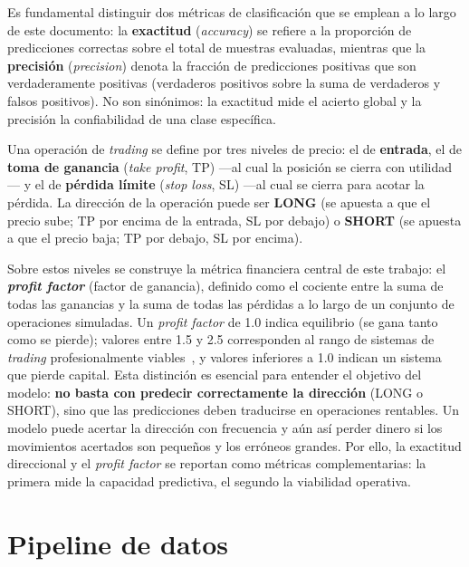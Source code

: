 \documentclass[10pt,twocolumn]{article}
\begin{document}
Es fundamental distinguir dos m\'etricas de clasificaci\'on que se emplean a lo largo de este documento: la \textbf{exactitud} (\textit{accuracy}) se refiere a la proporci\'on de predicciones correctas sobre el total de muestras evaluadas, mientras que la \textbf{precisi\'on} (\textit{precision}) denota la fracci\'on de predicciones positivas que son verdaderamente positivas (verdaderos positivos sobre la suma de verdaderos y falsos positivos). No son sin\'onimos: la exactitud mide el acierto global y la precisi\'on la confiabilidad de una clase espec\'ifica.

Una operaci\'on de \textit{trading} se define por tres niveles de precio: el de \textbf{entrada}, el de \textbf{toma de ganancia} (\textit{take profit}, TP) ---al cual la posici\'on se cierra con utilidad--- y el de \textbf{p\'erdida l\'imite} (\textit{stop loss}, SL) ---al cual se cierra para acotar la p\'erdida. La direcci\'on de la operaci\'on puede ser \textbf{LONG} (se apuesta a que el precio sube; TP por encima de la entrada, SL por debajo) o \textbf{SHORT} (se apuesta a que el precio baja; TP por debajo, SL por encima).

Sobre estos niveles se construye la m\'etrica financiera central de este trabajo: el \textbf{\textit{profit factor}} (factor de ganancia), definido como el cociente entre la suma de todas las ganancias y la suma de todas las p\'erdidas a lo largo de un conjunto de operaciones simuladas. Un \textit{profit factor} de 1.0 indica equilibrio (se gana tanto como se pierde); valores entre 1.5 y 2.5 corresponden al rango de sistemas de \textit{trading} profesionalmente viables~\cite{pardo2008}, y valores inferiores a 1.0 indican un sistema que pierde capital. Esta distinci\'on es esencial para entender el objetivo del modelo: \textbf{no basta con predecir correctamente la direcci\'on} (LONG o SHORT), sino que las predicciones deben traducirse en operaciones rentables. Un modelo puede acertar la direcci\'on con frecuencia y a\'un as\'i perder dinero si los movimientos acertados son peque\~nos y los err\'oneos grandes. Por ello, la exactitud direccional y el \textit{profit factor} se reportan como m\'etricas complementarias: la primera mide la capacidad predictiva, el segundo la viabilidad operativa.

\section{Pipeline de datos}
\end{document}
